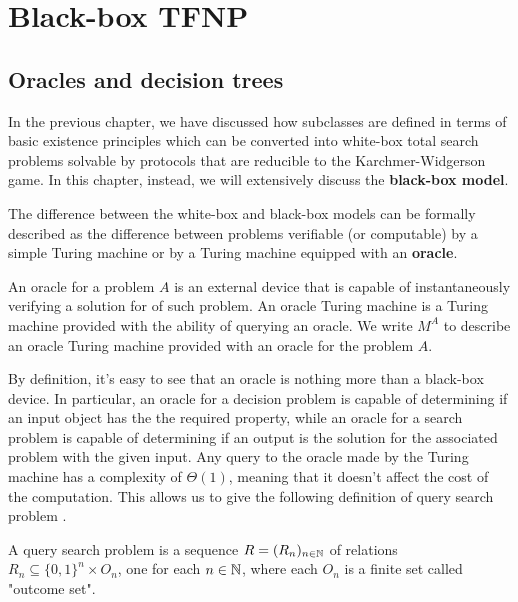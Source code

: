 
\chapter{Black-box TFNP} \label{chap:bb-tfnp}

\section{Oracles and decision trees}

In the previous chapter, we have discussed how \TFNP subclasses are defined in terms of basic existence principles which can be converted into white-box total search problems solvable by protocols that are reducible to the Karchmer-Widgerson game. In this chapter, instead, we will extensively discuss the \textbf{black-box model}.

The difference between the white-box and black-box \TFNP models can be formally described as the difference between problems verifiable (or computable) by a simple Turing machine or by a Turing machine equipped with an \textbf{oracle}. 

\begin{definition}
    An oracle for a problem $A$ is an external device that is capable of instantaneously verifying a solution for of such problem. An oracle Turing machine is a Turing machine provided with the ability of querying an oracle. We write $M^A$ to describe an oracle Turing machine provided with an oracle for the problem $A$.
\end{definition}

By definition, it's easy to see that an oracle is nothing more than a black-box device. In particular, an oracle for a decision problem is capable of determining if an input object has the the required property, while an oracle for a search problem is capable of determining if an output is the solution for the associated problem with the given input. Any query to the oracle made by the Turing machine has a complexity of $\Theta(1)$, meaning that it doesn't affect the cost of the computation. This allows us to give the following definition of query search problem \cite{proofs_circuits_communication, tfnp_characterization}.

\begin{definition}
    A query search problem is a sequence $R = (R_n)_{n \in \mathbb{N}}$ of relations $R_n \subseteq \{0,1\}^n \times O_n$, one for each $n \in \mathbb{N}$, where each $O_n$ is a finite set called "outcome set".
\end{definition}

